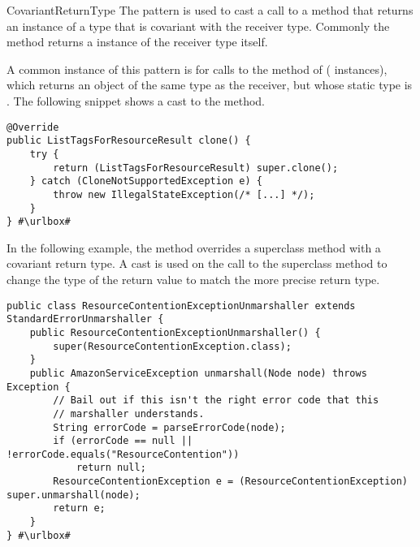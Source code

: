 \begin{pattern}{CovariantReturnType}
The \thisp{} pattern is used to cast a call to a method that returns
an instance of a type that is covariant with the receiver type.
Commonly the method returns a instance of the receiver type itself.

\instances{}
A common instance of this pattern is for calls to the  method of  (\nCovariantReturnTypeCloneSubpattern{} instances),
which returns an object of the same type as the receiver,
but whose static type is .
The following snippet shows a cast to the  method.

\def\urlvar{http://bit.ly/aws_aws_sdk_java_2GvHhYt}
\begin{verbatim}
@Override
public ListTagsForResourceResult clone() {
    try {
        return (ListTagsForResourceResult) super.clone();
    } catch (CloneNotSupportedException e) {
        throw new IllegalStateException(/* [...] */);
    }
} #\urlbox#
\end{verbatim}

In the following example,
the  method overrides a superclass method with a covariant return type.
A cast is used on the call to the superclass method to change the type of the return value to match the more precise return type.

\def\urlvar{http://bit.ly/aws_amplify_aws_sdk_android_2FVWl13}
\begin{verbatim}
public class ResourceContentionExceptionUnmarshaller extends StandardErrorUnmarshaller {
    public ResourceContentionExceptionUnmarshaller() {
        super(ResourceContentionException.class);
    }
    public AmazonServiceException unmarshall(Node node) throws Exception {
        // Bail out if this isn't the right error code that this
        // marshaller understands.
        String errorCode = parseErrorCode(node);
        if (errorCode == null || !errorCode.equals("ResourceContention"))
            return null;
        ResourceContentionException e = (ResourceContentionException) super.unmarshall(node);
        return e;
    }
} #\urlbox#
\end{verbatim}


\end{pattern}
